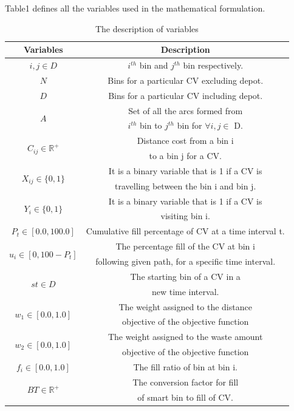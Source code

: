 \documentclass[12pt]{article}
\begin{document}
Table1 defines all the variables used in the mathematical formulation.
\begin{table}[H]\label{variables}
	\centering
	\caption{The description of variables}
	\begin{tabular}{|c|c|}
        \hline 
        \rowcolor{Gray1}\hspace{40pt} \textbf{Variables} \hspace{40pt} & \hspace{130pt} \textbf{Description} \hspace{130pt} \\
		\hline $i, j \in D$ & $i^{th}$ bin and $j^{th}$ bin respectively.\\
		\hline $N$ & Bins for a particular CV excluding depot.\\
		\hline $D$ & Bins for a particular CV including depot.\\
		\hline \multirow{2}{*}{$A$} & Set of all the arcs formed from \\
		&  $i^{th}$ bin to $j^{th}$ bin for $\forall i,j \in$ D.\\
		\hline \multirow{2}{*}{$C_{ij}\in \mathbb{R}^+$} & Distance cost from a bin i\\
		& to a bin j for a CV.\\
		\hline \multirow{2}{*}{$X_{ij} \in \{0, 1\}$} & It is a binary variable that is 1 if a CV is\\
		& travelling between the bin i and bin j.\\  
		\hline \multirow{2}{*}{$Y_{i} \in \{0, 1\}$} & It is a binary variable that is 1 if a CV is \\
		& visiting bin i.\\
		\hline \multirow{1}{*}{$P_{t} \in [0.0, 100.0]$} & Cumulative fill percentage of CV at a time interval t.\\
		\hline \multirow{2}{*}{$u_{i}  \in [0, 100 -P_{t}] $} & The percentage fill of the CV at bin i \\
		& following given path, for a specific time interval.\\
		\hline \multirow{2}{*}{$st \in D$} & The starting bin of a CV in a\\
		& new time interval.\\
		\hline \multirow{2}{*}{$w_{1} \in [0.0, 1.0]$} & The weight assigned to the distance \\
		& objective of the objective function\\
		\hline \multirow{2}{*}{$w_{2} \in [0.0, 1.0]$} & The weight assigned to the waste amount \\
		& objective of the objective function\\
		\hline \multirow{1}{*}{$f_{i} \in [0.0, 1.0]$} & The fill ratio of bin at bin i.\\
		\hline \multirow{2}{*}{$BT \in \mathbb{R}^+$} & The conversion factor for fill \\
		& of smart bin to fill of CV.\\
		
		\hline
    \end{tabular}
\end{table} 
\end{document}
